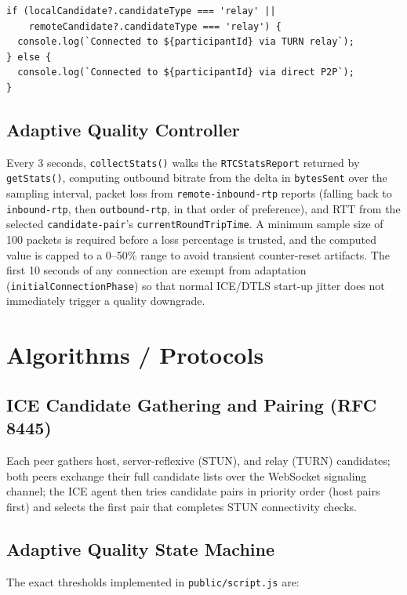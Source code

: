 \documentclass[12pt,a4paper]{report}
\begin{document}
\begin{lstlisting}[caption={Candidate-type detection on connect (public/script.js)}]
if (localCandidate?.candidateType === 'relay' ||
    remoteCandidate?.candidateType === 'relay') {
  console.log(`Connected to ${participantId} via TURN relay`);
} else {
  console.log(`Connected to ${participantId} via direct P2P`);
}
\end{lstlisting}

\subsection{Adaptive Quality Controller}
Every 3 seconds, \texttt{collectStats()} walks the \texttt{RTCStatsReport} returned by
\texttt{getStats()}, computing outbound bitrate from the delta in \texttt{bytesSent} over
the sampling interval, packet loss from \texttt{remote-inbound-rtp} reports (falling back to
\texttt{inbound-rtp}, then \texttt{outbound-rtp}, in that order of preference), and RTT from
the selected \texttt{candidate-pair}'s \texttt{currentRoundTripTime}. A minimum sample size
of 100 packets is required before a loss percentage is trusted, and the computed value is
capped to a 0--50\% range to avoid transient counter-reset artifacts. The first 10 seconds
of any connection are exempt from adaptation (\texttt{initialConnectionPhase}) so that
normal ICE/DTLS start-up jitter does not immediately trigger a quality downgrade.

\section{Algorithms / Protocols}

\subsection{ICE Candidate Gathering and Pairing (RFC 8445)}
Each peer gathers host, server-reflexive (STUN), and relay (TURN) candidates; both peers
exchange their full candidate lists over the WebSocket signaling channel; the ICE agent
then tries candidate pairs in priority order (host pairs first) and selects the first pair
that completes STUN connectivity checks.

\subsection{Adaptive Quality State Machine}
The exact thresholds implemented in \texttt{public/script.js} are:
\end{document}
